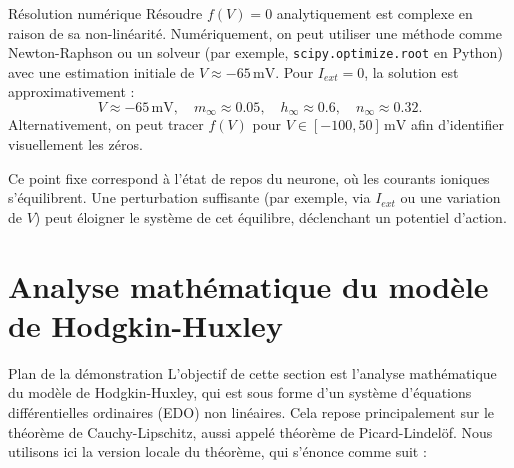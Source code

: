 \documentclass[10pt,french]{beamer}
\begin{document}
	\begin{frame}{Résolution numérique}
		Résoudre \( f(V) = 0 \) analytiquement est complexe en raison de sa non-linéarité. Numériquement, on peut utiliser une méthode comme Newton-Raphson ou un solveur (par exemple, \texttt{scipy.optimize.root} en Python) avec une estimation initiale de \( V \approx -65 \, \text{mV} \). Pour \( I_{ext} = 0 \), la solution est approximativement :
		\[
		V \approx -65 \, \text{mV}, \quad m_\infty \approx 0.05, \quad h_\infty \approx 0.6, \quad n_\infty \approx 0.32.
		\]
		Alternativement, on peut tracer \( f(V) \) pour \( V \in [-100, 50] \, \text{mV} \) afin d'identifier visuellement les zéros.
		
		Ce point fixe correspond à l'état de repos du neurone, où les courants ioniques s'équilibrent. Une perturbation suffisante (par exemple, via \( I_{ext} \) ou une variation de \( V \)) peut éloigner le système de cet équilibre, déclenchant un potentiel d'action.
	\end{frame}
	
	\section{Analyse mathématique du modèle de Hodgkin-Huxley}
	\begin{frame}{Plan de la démonstration \cite{brddy2000hodgkin} \cite{dayan2001theoretical} \cite{coddington1955theory}}
		L’objectif de cette section est l’analyse mathématique du modèle de Hodgkin-Huxley, qui est sous forme d'un système d'équations différentielles ordinaires (EDO) non linéaires. 
		Cela repose principalement sur le théorème de Cauchy-Lipschitz, aussi appelé théorème de Picard-Lindelöf. Nous utilisons ici la version locale du théorème, qui s'énonce comme suit :
	\end{frame}                    
	
\end{document}
